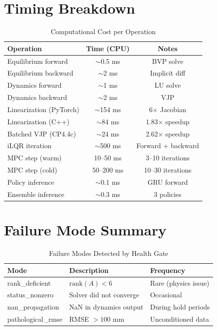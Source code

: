 \documentclass[conference]{IEEEtran}
\begin{document}
\section{Timing Breakdown}

\begin{table}[h]
\centering
\caption{Computational Cost per Operation}
\begin{tabular}{lcc}
\toprule
Operation & Time (CPU) & Notes \\
\midrule
Equilibrium forward & $\sim$0.5 ms & BVP solve \\
Equilibrium backward & $\sim$2 ms & Implicit diff \\
Dynamics forward & $\sim$1 ms & LU solve \\
Dynamics backward & $\sim$2 ms & VJP \\
Linearization (PyTorch) & $\sim$154 ms & 6$\times$ Jacobian \\
Linearization (C++) & $\sim$84 ms & 1.83$\times$ speedup \\
Batched VJP (CP4.4c) & $\sim$24 ms & 2.62$\times$ speedup \\
iLQR iteration & $\sim$500 ms & Forward + backward \\
MPC step (warm) & 10--50 ms & 3--10 iterations \\
MPC step (cold) & 50--200 ms & 10--30 iterations \\
Policy inference & $\sim$0.1 ms & GRU forward \\
Ensemble inference & $\sim$0.3 ms & 3 policies \\
\bottomrule
\end{tabular}
\end{table}

\section{Failure Mode Summary}

\begin{table}[h]
\centering
\caption{Failure Modes Detected by Health Gate}
\begin{tabular}{lp{4cm}p{2cm}}
\toprule
Mode & Description & Frequency \\
\midrule
rank\_deficient & $\text{rank}(A) < 6$ & Rare (physics issue) \\
status\_nonzero & Solver did not converge & Occasional \\
nan\_propagation & NaN in dynamics output & During hold periods \\
pathological\_rmse & RMSE $> 100$ mm & Unconditioned data \\
\bottomrule
\end{tabular}
\end{table}
\end{document}
